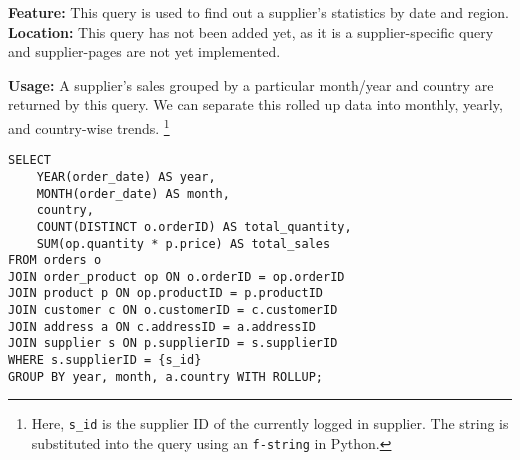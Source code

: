 \textbf{Feature:} This query is used to find out a supplier's statistics by date and region. \\
\textbf{Location:} This query has not been added yet, as it is a supplier-specific query and supplier-pages are not yet implemented.

\textbf{Usage:}
A supplier's sales grouped by a particular month/year and country are returned by this query.
We can separate this rolled up data into monthly, yearly, and country-wise trends.
\footnote{
    Here, \texttt{s\_id} is the supplier ID of the currently logged in supplier.
    The string is substituted into the query using an \texttt{f-string} in Python.
}

\vspace*{10pt}

\begin{lstlisting}
SELECT
    YEAR(order_date) AS year,
    MONTH(order_date) AS month,
    country,
    COUNT(DISTINCT o.orderID) AS total_quantity,
    SUM(op.quantity * p.price) AS total_sales
FROM orders o
JOIN order_product op ON o.orderID = op.orderID
JOIN product p ON op.productID = p.productID
JOIN customer c ON o.customerID = c.customerID
JOIN address a ON c.addressID = a.addressID
JOIN supplier s ON p.supplierID = s.supplierID
WHERE s.supplierID = {s_id}
GROUP BY year, month, a.country WITH ROLLUP;
\end{lstlisting}